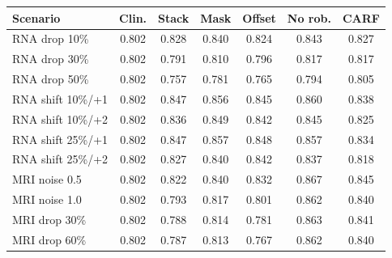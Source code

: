 \begin{tabular}{@{}lcccccc@{}}
\toprule
Scenario & Clin. & Stack & Mask & Offset & No rob. & CARF \\
\midrule
RNA drop 10\% & 0.802 & 0.828 & 0.840 & 0.824 & 0.843 & 0.827 \\
RNA drop 30\% & 0.802 & 0.791 & 0.810 & 0.796 & 0.817 & 0.817 \\
RNA drop 50\% & 0.802 & 0.757 & 0.781 & 0.765 & 0.794 & 0.805 \\
RNA shift 10\%/+1 & 0.802 & 0.847 & 0.856 & 0.845 & 0.860 & 0.838 \\
RNA shift 10\%/+2 & 0.802 & 0.836 & 0.849 & 0.842 & 0.845 & 0.825 \\
RNA shift 25\%/+1 & 0.802 & 0.847 & 0.857 & 0.848 & 0.857 & 0.834 \\
RNA shift 25\%/+2 & 0.802 & 0.827 & 0.840 & 0.842 & 0.837 & 0.818 \\
MRI noise 0.5 & 0.802 & 0.822 & 0.840 & 0.832 & 0.867 & 0.845 \\
MRI noise 1.0 & 0.802 & 0.793 & 0.817 & 0.801 & 0.862 & 0.840 \\
MRI drop 30\% & 0.802 & 0.788 & 0.814 & 0.781 & 0.863 & 0.841 \\
MRI drop 60\% & 0.802 & 0.787 & 0.813 & 0.767 & 0.862 & 0.840 \\
\bottomrule
\end{tabular}
